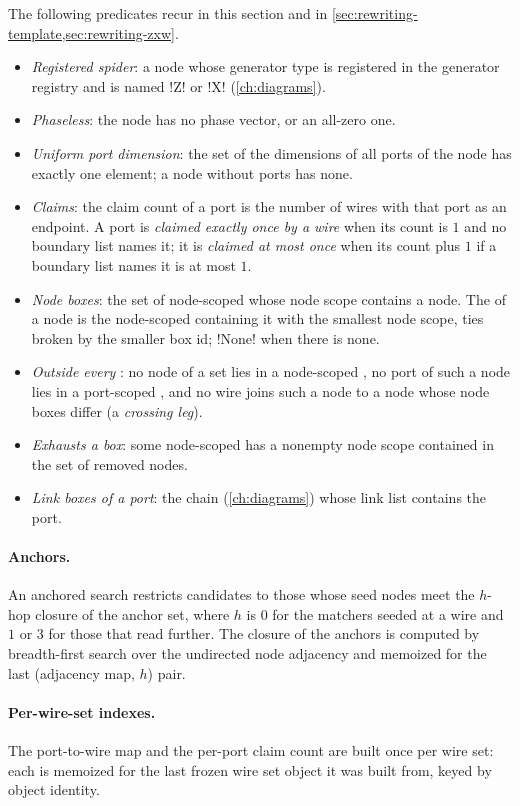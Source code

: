 The following predicates recur in this section and in \cref{sec:rewriting-template,sec:rewriting-zxw}.
\begin{itemize}
\item \emph{Registered spider}: a node whose generator type is registered in the generator
  registry and is named \code!Z! or \code!X! (\cref{ch:diagrams}).
\item \emph{Phaseless}: the node has no phase vector, or an all-zero one.
\item \emph{Uniform port dimension}: the set of the dimensions of all ports of the node has exactly
  one element; a node without ports has none.
\item \emph{Claims}: the claim count of a port is the number of wires with that port as an
  endpoint. A port is \emph{claimed exactly once by a wire} when its count is $1$ and no boundary
  list names it; it is \emph{claimed at most once} when its count plus $1$ if a boundary list
  names it is at most $1$.
\item \emph{Node boxes}: the set of node-scoped \bboxes{} whose node scope contains a node.
  The  of a node is the node-scoped \bbox{} containing it with the
  smallest node scope, ties broken by the smaller box id; \py!None! when there is none.
\item \emph{Outside every \bbox{}}: no node of a set lies in a node-scoped \bbox{}, no port of
  such a node lies in a port-scoped \bbox{}, and no wire joins such a node to a node whose node
  boxes differ (a \emph{crossing leg}).
\item \emph{Exhausts a box}: some node-scoped \bbox{} has a nonempty node scope contained in the
  set of removed nodes.
\item \emph{Link boxes of a port}: the chain \bboxes{} (\cref{ch:diagrams}) whose link list
  contains the port.
\end{itemize}

\paragraph{Anchors.}
An anchored search restricts candidates to those whose seed nodes meet the $h$-hop closure of the
anchor set, where $h$ is $0$ for the matchers seeded at a wire and $1$ or $3$ for those that read
further. The closure of the anchors is computed by breadth-first search over the undirected
node adjacency and memoized for the last (adjacency map, $h$) pair.

\paragraph{Per-wire-set indexes.}
The port-to-wire map and the per-port claim count are built once per wire set: each is memoized
for the last frozen wire set object it was built from, keyed by object identity.

